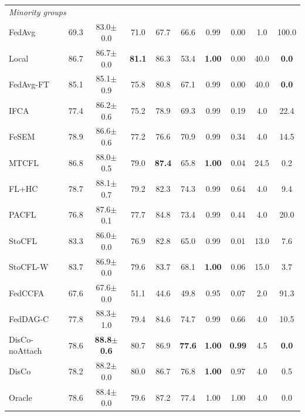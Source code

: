 \begin{tabular}{lccccccccc}
\midrule
\multicolumn{10}{l}{\textit{Minority groups}}\\
FedAvg & 69.3 & 83.0$\pm$0.0 & 71.0 & 67.7 & 66.6 & 0.99 & 0.00 & 1.0 & 100.0 \\
Local & 86.7 & 86.7$\pm$0.0 & \textbf{81.1} & 86.3 & 53.4 & \textbf{1.00} & 0.00 & 40.0 & \textbf{0.0} \\
FedAvg-FT & 85.1 & 85.1$\pm$0.9 & 75.8 & 80.8 & 67.1 & 0.99 & 0.00 & 40.0 & \textbf{0.0} \\
IFCA & 77.4 & 86.2$\pm$0.6 & 75.2 & 78.9 & 69.3 & 0.99 & 0.19 & 4.0 & 22.4 \\
FeSEM & 78.9 & 86.6$\pm$0.6 & 77.2 & 76.6 & 70.9 & 0.99 & 0.34 & 4.0 & 14.5 \\
MTCFL & 86.8 & 88.0$\pm$0.5 & 79.0 & \textbf{87.4} & 65.8 & \textbf{1.00} & 0.04 & 24.5 & 0.2 \\
FL+HC & 78.7 & 88.1$\pm$0.7 & 79.2 & 82.3 & 74.3 & 0.99 & 0.64 & 4.0 & 9.4 \\
PACFL & 76.8 & 87.6$\pm$0.1 & 77.7 & 84.8 & 73.4 & 0.99 & 0.44 & 4.0 & 20.0 \\
StoCFL & 83.3 & 86.0$\pm$0.0 & 76.9 & 82.8 & 65.0 & 0.99 & 0.01 & 13.0 & 7.6 \\
StoCFL-W & 83.7 & 86.9$\pm$0.0 & 79.6 & 83.7 & 68.1 & \textbf{1.00} & 0.06 & 15.0 & 3.7 \\
FedCCFA & 67.6 & 67.6$\pm$0.0 & 51.1 & 44.6 & 49.8 & 0.95 & 0.07 & 2.0 & 91.3 \\
FedDAG-C & 77.8 & 88.3$\pm$1.0 & 79.4 & 84.6 & 74.7 & 0.99 & 0.66 & 4.0 & 10.5 \\
DisCo-noAttach & 78.6 & \textbf{88.8$\pm$0.6} & 80.7 & 86.9 & \textbf{77.6} & \textbf{1.00} & \textbf{0.99} & 4.5 & \textbf{0.0} \\
DisCo & 78.2 & 88.2$\pm$0.0 & 80.0 & 86.7 & 76.8 & \textbf{1.00} & 0.97 & 4.0 & 0.5 \\
Oracle & 78.6 & 88.4$\pm$0.0 & 79.6 & 87.2 & 77.4 & 1.00 & 1.00 & 4.0 & 0.0 \\
\bottomrule
\end{tabular}
